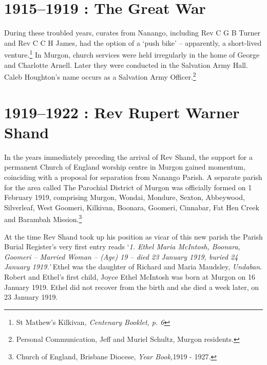 \section{1915--1919 : The Great War}

During these troubled years, curates from Nanango, including Rev C G B
Turner and Rev C C H James\emph{,} had the option of a `push bike' --
apparently, a short-lived venture.\footnote{St Mathew's Kilkivan\emph{,
  Centenary Booklet, p. 6}} In Murgon, church services were held
irregularly in the home of George and Charlotte Arnell. Later they were
conducted in the Salvation Army Hall. Caleb Houghton's name occurs as a
Salvation Army Officer.\footnote{Personal Communication, Jeff and Muriel
  Schultz, Murgon residents.}

\section{1919--1922 : Rev Rupert Warner
Shand}

In the years immediately preceding the arrival of Rev Shand, the support
for a permanent Church of England worship centre in Murgon gained
momentum, coinciding with a proposal for separation from Nanango Parish.
A separate parish for the area called The Parochial District of Murgon
was officially formed on 1 February 1919, comprising Murgon, Wondai,
Mondure, Sexton, Abbeywood, Silverleaf, West Goomeri, Kilkivan, Boonara,
Goomeri, Cinnabar, Fat Hen Creek and Barambah Mission.\footnote{Church
  of England, Brisbane Diocese, \emph{Year Book,}1919 - 1927.}

At the time Rev Shand took up his position as vicar of this new parish
the Parish Burial Register's very first entry reads `\emph{1. Ethel
Maria McIntosh, Boonara, Goomeri -- Married Woman -- (Age) 19 -- died 23
January 1919, buried 24 January 1919.'} Ethel was the daughter of
Richard and Maria Maudsley, \emph{Undaban}. Robert and Ethel's first
child, Joyce Ethel McIntosh was born at Murgon on 16 January 1919. Ethel
did not recover from the birth and she died a week later, on 23 January
1919.




